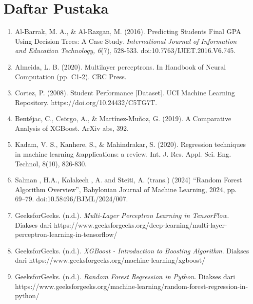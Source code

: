 \chapter*{Daftar Pustaka}
\begin{enumerate}
    \item Al-Barrak, M. A., \& Al-Razgan, M. {(2016)}. Predicting Students Final GPA Using Decision Trees: A Case Study. \textit{International Journal of Information and Education Technology, 6}{(7)}, 528-533. doi:10.7763{/}IJIET.2016.V6.745.
    \item  Almeida, L. B. (2020). Multilayer perceptrons. In Handbook of Neural Computation (pp. C1-2). CRC Press.
    \item Cortez, P. (2008). Student Performance [Dataset]. UCI Machine Learning Repository. https://doi.org/10.24432/C5TG7T.
    \item Bentéjac, C., Csörgo, A., \& Martínez-Muñoz, G. (2019). A Comparative Analysis of XGBoost. ArXiv abs, 392.
    \item Kadam, V. S., Kanhere, S., \& Mahindrakar, S. (2020). Regression techniques in machine learning \&applications: a review. Int. J. Res. Appl. Sci. Eng. Technol, 8(10), 826-830.
    \item Salman , H.A., Kalakech , A. and Steiti, A. (trans.) (2024) “Random Forest Algorithm Overview”, Babylonian Journal of Machine Learning, 2024, pp. 69–79. doi:10.58496/BJML/2024/007.

    \item GeeksforGeeks. (n.d.). \textit{Multi-Layer Perceptron Learning in TensorFlow}. Diakses dari https://www.geeksforgeeks.org/deep-learning/multi-layer-perceptron-learning-in-tensorflow/
    
    \item GeeksforGeeks. (n.d.). \textit{XGBoost - Introduction to Boosting Algorithm}. Diakses dari https://www.geeksforgeeks.org/machine-learning/xgboost/
    
    \item GeeksforGeeks. (n.d.). \textit{Random Forest Regression in Python}. Diakses dari https://www.geeksforgeeks.org/machine-learning/random-forest-regression-in-python/
\end{enumerate}
